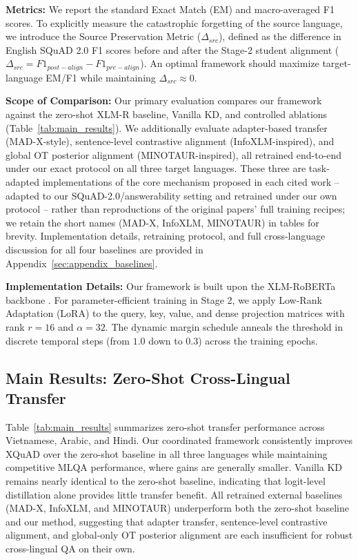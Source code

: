 \documentclass[11pt]{article}
\begin{document}
\textbf{Metrics:} We report the standard Exact Match (EM) and macro-averaged F1 scores. To explicitly measure the catastrophic forgetting of the source language, we introduce the Source Preservation Metric ($\Delta_{src}$), defined as the difference in English SQuAD 2.0 F1 scores before and after the Stage-2 student alignment ($\Delta_{src} = F1_{post-align} - F1_{pre-align}$). An optimal framework should maximize target-language EM/F1 while maintaining $\Delta_{src} \approx 0$.

\textbf{Scope of Comparison:} Our primary evaluation compares our framework against the zero-shot XLM-R baseline, Vanilla KD, and controlled ablations (Table~\ref{tab:main_results}). We additionally evaluate adapter-based transfer (MAD-X-style), sentence-level contrastive alignment (InfoXLM-inspired), and global OT posterior alignment (MINOTAUR-inspired), all retrained end-to-end under our exact protocol on all three target languages. These three are task-adapted implementations of the core mechanism proposed in each cited work -- adapted to our SQuAD-2.0/answerability setting and retrained under our own protocol -- rather than reproductions of the original papers' full training recipes; we retain the short names (MAD-X, InfoXLM, MINOTAUR) in tables for brevity. Implementation details, retraining protocol, and full cross-language discussion for all four baselines are provided in Appendix~\ref{sec:appendix_baselines}.

\textbf{Implementation Details:} Our framework is built upon the XLM-RoBERTa backbone \citep{conneau-etal-2020-unsupervised}. For parameter-efficient training in Stage 2, we apply Low-Rank Adaptation (LoRA) \citep{hu2021loralowrankadaptationlarge} to the query, key, value, and dense projection matrices with rank $r=16$ and $\alpha=32$. The dynamic margin schedule anneals the threshold in discrete temporal steps (from $1.0$ down to $0.3$) across the training epochs. 

\subsection{Main Results: Zero-Shot Cross-Lingual Transfer}

Table~\ref{tab:main_results} summarizes zero-shot transfer performance across Vietnamese, Arabic, and Hindi. Our coordinated framework consistently improves XQuAD over the zero-shot baseline in all three languages while maintaining competitive MLQA performance, where gains are generally smaller. Vanilla KD remains nearly identical to the zero-shot baseline, indicating that logit-level distillation alone provides little transfer benefit. All retrained external baselines (MAD-X, InfoXLM, and MINOTAUR) underperform both the zero-shot baseline and our method, suggesting that adapter transfer, sentence-level contrastive alignment, and global-only OT posterior alignment are each insufficient for robust cross-lingual QA on their own.
\end{document}
